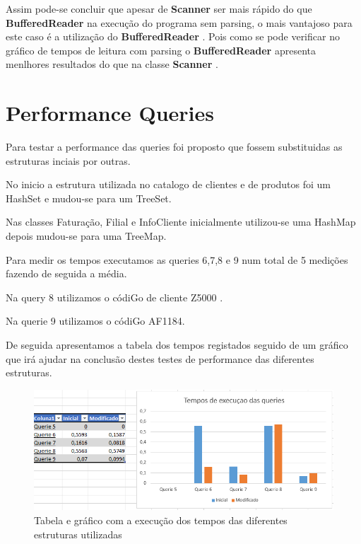 \par Assim pode-se concluir que apesar de \color{blue} \textbf{Scanner} \color{black} ser mais rápido do que  \color{blue} \textbf{BufferedReader} \color{black} na execução do programa sem parsing, o mais vantajoso para este caso é a utilização do \color{blue} \textbf{BufferedReader} \color{black}. Pois como se pode verificar no gráfico de tempos de leitura com parsing o  \color{blue} \textbf{BufferedReader} \color{black} apresenta menlhores resultados do que na classe \color{blue} \textbf{Scanner} \color{black}. 


\section{Performance Queries }
Para testar a performance das queries foi proposto que fossem substituidas as estruturas inciais por outras. 


No inicio a estrutura utilizada no catalogo de clientes e de produtos foi um HashSet e mudou-se para um TreeSet. 


Nas classes Faturação, Filial e InfoCliente inicialmente utilizou-se uma HashMap depois mudou-se para uma TreeMap. 

Para medir os tempos executamos as queries 6,7,8 e 9 num total de 5 medições fazendo de seguida a média.


Na query 8 utilizamos o códiGo de cliente Z5000 . 

Na querie 9 utilizamos o códiGo AF1184. 

\par De seguida apresentamos a tabela dos tempos registados seguido de um gráfico que irá ajudar na conclusão destes testes de performance das diferentes estruturas.

\begin{figure}[h!]
	\includegraphics[scale=0.8]{graficoqueries}  
	\caption{Tabela e gráfico com a execução dos tempos das diferentes estruturas utilizadas }  
\end{figure}
  	